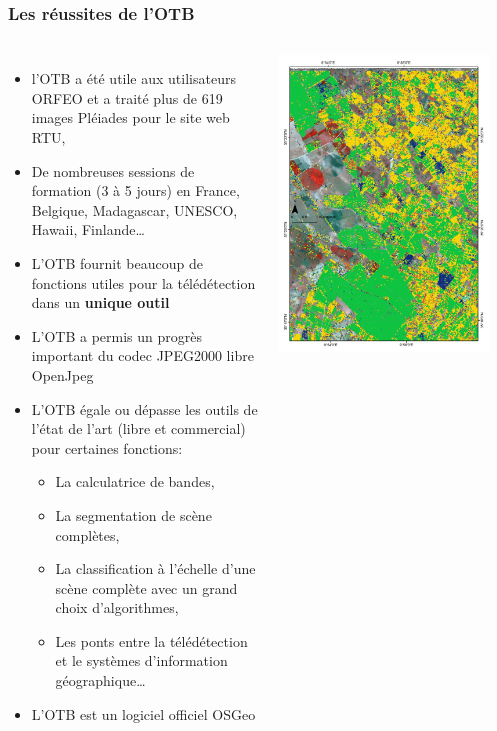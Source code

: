 \documentclass[8pt]{beamer}
\begin{document}
\begin{frame}
\frametitle{Les réussites de l'OTB}
\vspace{-0.5cm}
\begin{columns}
\begin{itemize}
\item l'OTB a été utile aux utilisateurs ORFEO et a traité plus de 619 images Pléiades pour le site web RTU,
\item De nombreuses sessions de formation (3 à 5 jours) en France, Belgique, Madagascar, UNESCO, Hawaii, Finlande\ldots
\item L'OTB fournit beaucoup de fonctions utiles pour la télédétection dans un \textbf{unique outil}
\item L'OTB a permis un progrès important du codec JPEG2000 libre OpenJpeg
\item L'OTB égale ou dépasse les outils de l'état de l'art (libre et commercial) pour certaines fonctions:
\begin{itemize}
\item La calculatrice de bandes,
\item La segmentation de scène complètes,
\item La classification à l'échelle d'une scène complète avec un grand choix d'algorithmes,
\item Les ponts entre la télédétection et le systèmes d'information géographique\ldots
\end{itemize}
\item L'OTB est un logiciel officiel OSGeo
\end{itemize}
\includegraphics[width=0.9\textwidth]{images/resultats_ird.png}\\

\end{columns}
\end{frame}
\end{document}
